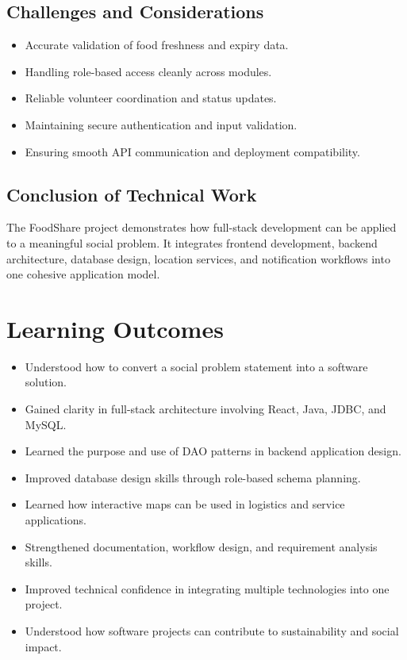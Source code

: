 \documentclass[12pt,a4paper]{report}
\newcommand{\projecttitle}{FoodShare}
\begin{document}
\section{Challenges and Considerations}
\begin{itemize}[leftmargin=1.2cm]
\item Accurate validation of food freshness and expiry data.
\item Handling role-based access cleanly across modules.
\item Reliable volunteer coordination and status updates.
\item Maintaining secure authentication and input validation.
\item Ensuring smooth API communication and deployment compatibility.
\end{itemize}

\section{Conclusion of Technical Work}
The \projecttitle{} project demonstrates how full-stack development can be applied to a meaningful social problem. It integrates frontend development, backend architecture, database design, location services, and notification workflows into one cohesive application model.

\chapter{Learning Outcomes}
\begin{itemize}[leftmargin=1.2cm]
\item Understood how to convert a social problem statement into a software solution.
\item Gained clarity in full-stack architecture involving React, Java, JDBC, and MySQL.
\item Learned the purpose and use of DAO patterns in backend application design.
\item Improved database design skills through role-based schema planning.
\item Learned how interactive maps can be used in logistics and service applications.
\item Strengthened documentation, workflow design, and requirement analysis skills.
\item Improved technical confidence in integrating multiple technologies into one project.
\item Understood how software projects can contribute to sustainability and social impact.
\end{itemize}
\end{document}
